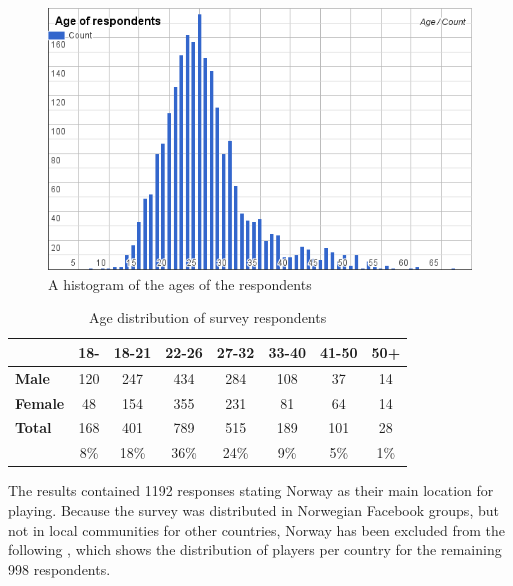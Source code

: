 \begin{figure}[h]
	\centering
	\includegraphics[width=\textwidth]{Figures/age-histogram}
	\caption{A histogram of the ages of the respondents}
	\label{fig:respondents-age-histogram}
\end{figure}

\begin{table}[h]
	\centering
	\caption{Age distribution of survey respondents}
	\label{tbl:survey-age-distribution}
	\begin{tabular}{|l||c|c|c|c|c|c|c|}
		\hline
		&\textbf{18-} & \textbf{18-21} & \textbf{22-26} & \textbf{27-32} & \textbf{33-40} & \textbf{41-50} & \textbf{50+}\\
		\hline\hline
		
		\textbf{Male} & 120 & 247 & 434 & 284 & 108 & 37 & 14 \\
		\hline
		
		\textbf{Female} & 48 & 154 & 355 & 231 & 81 & 64 & 14 \\
		\hline
		
		\textbf{Total} & 168 & 401 & 789 & 515 & 189 & 101 & 28 \\
						& 8\% & 18\% & 36\% & 24\% & 9\% & 5\% & 1\%\\
		\hline
	\end{tabular}
\end{table}


The results contained 1192 responses stating Norway as their main location for playing. Because the survey was distributed in Norwegian Facebook groups, but not in local communities for other countries, Norway has been excluded from the following , which shows the distribution of players per country for the remaining 998 respondents.

